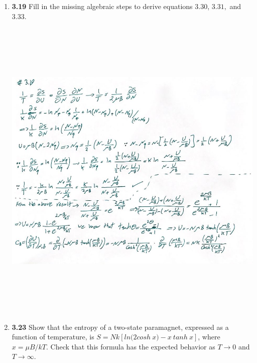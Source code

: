 \documentclass[fleqn]{article}
\begin{document}
  \begin{enumerate}
    \item \textbf{3.19} Fill in the missing algebraic steps to derive equations $3.30$, $3.31,$ and $3.33$.

    \begin{center}
      \includegraphics[height=15cm, width=15cm]{319.JPG}
    \end{center}

    \pagebreak

    \item \textbf{3.23} Show that the entropy of a two-state paramagnet, expressed as a function of temperature, 
    is $S=N k \left[ln \bigg( 2 cosh ~ x\bigg)-x ~ tanh ~ x\right]$, where $x=\mu B/kT$. Check that this formula
    has the expected behavior as $T \longrightarrow 0$ and $T \longrightarrow \infty$.
  

\end{enumerate}
\end{document}
